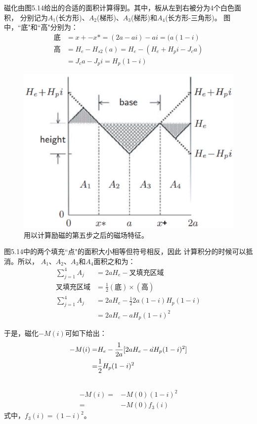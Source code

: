 磁化由图5.14给出的合适的面积计算得到。其中，板从左到右被分为4个白色面积，
分别记为$A_1$(长方形)、$A_2$(梯形)、$A_3$(梯形)和$A_4$(长方形-三角形)。
图中，``底"和``高"分别为：
\begin{align*}
\mbox{底}&=x+-x*=(2a-ai)-ai=(a(1-i)\\
\mbox{高}&=H_{e}-H_{s2}(a)=H_{e}-(H_{e}+H_{p}i-J_{c}a)\\
&=J_{c}a-J_{p}i=H_{p}(1-i)
\end{align*}

\begin{figure}[htbp]
	\centering
	\includegraphics[scale=0.6]{chpt5/figs/fig5.14.eps}
	\caption{用以计算励磁的第五步之后的磁场特征。}
\end{figure}

图5.14中的两个填充``点"的面积大小相等但符号相反，因此
计算积分的时候可以抵消。所以，
$A_1$、$A_2$、$A_3$和$A_4$面积之和为：
\begin{align*}
\sum_{j=1}^{4}A_{j}&=2aH_{e}-\mbox{叉填充区域}\\
\mbox{叉填充区域}&=\frac{1}{2}(\mbox{底})\times(\mbox{高})\\
\sum_{j=1}^{4}A_{j}&=2aH_{e}-\frac{1}{2}2a(1-i)H_{p}(1-i)\\
&=2aH_{e}-aH_{p}(1-i)^{2}
\end{align*}

于是，磁化$−M(i)$可如下给出：
\begin{align*}%
-M(i)=&H_{e}-\frac{1}{2a}[2aH_{e}-a \grave{}H_{p}(1-i)^{2}]\\
=&\frac{1}{2}H_{p}(1-i)^{2}\\\notag
\end{align*}
\begin{subequations}
	\begin{align}%
	-M(i)=&-M(0)(1-i)^{2}\\
	=&-M(0)f_{3}(i)
	\end{align}
\end{subequations}
式中，$f_3(i) = (1 − i)^2$。

